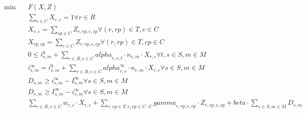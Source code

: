 \begin{align}
  \min\quad & F(X,Z) \tag{eq\_0002} \\
  & \sum_{c \in C} X_{r , c} = 1 \forall r \in R \tag{eq\_0003} \\
  & X_{r , c} = \sum_{cp \in C} Z_{r , rp , c , cp} \forall \left(r , rp\right) \in T , c \in C \tag{eq\_0004} \\
  & X_{rp , cp} = \sum_{c \in C} Z_{r , rp , c , cp} \forall \left(r , rp\right) \in T , cp \in C \tag{eq\_0005} \\
  & 0 \leq i_{s , m}^{0} + \sum_{r \in R, c \in C} \mathit{alpha}_{r , s , t} \cdot n_{c , m} \cdot X_{r , c} \forall t , s \in S , m \in M \tag{eq\_0006} \\
  & i_{s , m}^{\infty} = i_{s , m}^{0} + \sum_{r \in R, c \in C} \mathit{alpha}_{r , s}^{\infty} \cdot n_{c , m} \cdot X_{r , c} \forall s \in S , m \in M \tag{eq\_0007} \\
  & D_{s , m} \geq i_{s , m}^{\infty} - I_{s , m}^{\infty} \forall s \in S , m \in M \tag{eq\_0008\_a} \\
  & D_{s , m} \geq I_{s , m}^{\infty} - i_{s , m}^{\infty} \forall s \in S , m \in M \tag{eq\_0008\_b} \\
  & \sum_{r \in R, c \in C} w_{r , c} \cdot X_{r , c} + \sum_{r , rp \in T, c , cp \in C \cdot C} \mathit{gamma}_{r , rp , c , cp} \cdot Z_{r , rp , c , cp} + \mathit{beta} \cdot \sum_{s \in S, m \in M} D_{s , m} \tag{eq\_0009} \\
\end{align}
